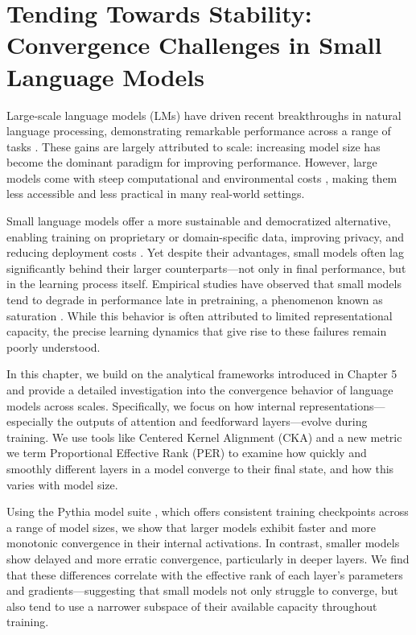 \chapter{Tending Towards Stability: Convergence Challenges in Small Language Models}
\label{chapter:tending-towards-stability}

Large-scale language models (LMs) have driven recent breakthroughs in natural language processing, demonstrating remarkable performance across a range of tasks \citep{hendrycks2021mmlu, chowdhery2023palm}. These gains are largely attributed to scale: increasing model size has become the dominant paradigm for improving performance. However, large models come with steep computational and environmental costs \citep{schwartz2020greenai}, making them less accessible and less practical in many real-world settings.

Small language models offer a more sustainable and democratized alternative, enabling training on proprietary or domain-specific data, improving privacy, and reducing deployment costs \citep{huang2022large, bender2021dangers}. Yet despite their advantages, small models often lag significantly behind their larger counterparts—not only in final performance, but in the learning process itself. Empirical studies have observed that small models tend to degrade in performance late in pretraining, a phenomenon known as saturation \citep{godey2024small}. While this behavior is often attributed to limited representational capacity, the precise learning dynamics that give rise to these failures remain poorly understood.

In this chapter, we build on the analytical frameworks introduced in Chapter 5 and provide a detailed investigation into the convergence behavior of language models across scales. Specifically, we focus on how internal representations—especially the outputs of attention and feedforward layers—evolve during training. We use tools like Centered Kernel Alignment (CKA) and a new metric we term Proportional Effective Rank (PER) to examine how quickly and smoothly different layers in a model converge to their final state, and how this varies with model size.

Using the Pythia model suite \citep{biderman2023pythia}, which offers consistent training checkpoints across a range of model sizes, we show that larger models exhibit faster and more monotonic convergence in their internal activations. In contrast, smaller models show delayed and more erratic convergence, particularly in deeper layers. We find that these differences correlate with the effective rank of each layer’s parameters and gradients—suggesting that small models not only struggle to converge, but also tend to use a narrower subspace of their available capacity throughout training.

